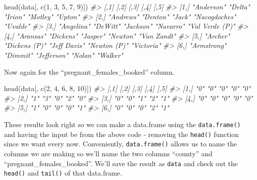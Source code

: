 \documentclass[
]{krantz}
\makeatletter
\newenvironment{Shaded}{\begin{snugshade}}{\end{snugshade}}
\newcommand{\CommentTok}[1]{\textcolor[rgb]{0.37,0.37,0.37}{\textit{#1}}}
\newcommand{\DecValTok}[1]{\textcolor[rgb]{0.06,0.06,0.06}{#1}}
\newcommand{\FunctionTok}[1]{\textcolor[rgb]{0,0,0}{#1}}
\newcommand{\NormalTok}[1]{#1}
\newenvironment{kframe}{%
\medskip{}
\setlength{\fboxsep}{.8em}
 \def\at@end@of@kframe{}%
 \ifinner\ifhmode%
  \def\at@end@of@kframe{\end{minipage}}%
  \begin{minipage}{\columnwidth}%
 \fi\fi%
 \def\FrameCommand##1{\hskip\@totalleftmargin \hskip-\fboxsep
 \colorbox{shadecolor}{##1}\hskip-\fboxsep
     \hskip-\linewidth \hskip-\@totalleftmargin \hskip\columnwidth}%
 \MakeFramed {\advance\hsize-\width
   \@totalleftmargin\z@ \linewidth\hsize
   \@setminipage}}%
 {\par\unskip\endMakeFramed%
 \at@end@of@kframe}
\renewenvironment{Shaded}{\begin{kframe}}{\end{kframe}}
\makeatother
\begin{document}
\begin{Shaded}
\begin{Highlighting}[]
\FunctionTok{head}\NormalTok{(data[, }\FunctionTok{c}\NormalTok{(}\DecValTok{1}\NormalTok{, }\DecValTok{3}\NormalTok{, }\DecValTok{5}\NormalTok{, }\DecValTok{7}\NormalTok{, }\DecValTok{9}\NormalTok{)])}
\CommentTok{\#\textgreater{}      [,1]        [,2]          [,3]         [,4]          [,5]           }
\CommentTok{\#\textgreater{} [1,] "Anderson"  "Delta"       "Irion"      "Motley"      "Upton"        }
\CommentTok{\#\textgreater{} [2,] "Andrews"   "Denton"      "Jack"       "Nacogdoches" "Uvalde"       }
\CommentTok{\#\textgreater{} [3,] "Angelina"  "DeWitt"      "Jackson"    "Navarro"     "Val Verde (P)"}
\CommentTok{\#\textgreater{} [4,] "Aransas"   "Dickens"     "Jasper"     "Newton"      "Van Zandt"    }
\CommentTok{\#\textgreater{} [5,] "Archer"    "Dickens (P)" "Jeff Davis" "Newton (P)"  "Victoria"     }
\CommentTok{\#\textgreater{} [6,] "Armstrong" "Dimmit"      "Jefferson"  "Nolan"       "Walker"}
\end{Highlighting}
\end{Shaded}

Now again for the ``pregnant\_females\_booked'' column.

\begin{Shaded}
\begin{Highlighting}[]
\FunctionTok{head}\NormalTok{(data[, }\FunctionTok{c}\NormalTok{(}\DecValTok{2}\NormalTok{, }\DecValTok{4}\NormalTok{, }\DecValTok{6}\NormalTok{, }\DecValTok{8}\NormalTok{, }\DecValTok{10}\NormalTok{)])}
\CommentTok{\#\textgreater{}      [,1] [,2] [,3] [,4] [,5]}
\CommentTok{\#\textgreater{} [1,] "0"  "0"  "0"  "0"  "0" }
\CommentTok{\#\textgreater{} [2,] "1"  "3"  "0"  "2"  "0" }
\CommentTok{\#\textgreater{} [3,] "0"  "0"  "1"  "2"  "1" }
\CommentTok{\#\textgreater{} [4,] "0"  "0"  "0"  "0"  "0" }
\CommentTok{\#\textgreater{} [5,] "1"  "0"  "0"  "0"  "1" }
\CommentTok{\#\textgreater{} [6,] "0"  "0"  "0"  "2"  "1"}
\end{Highlighting}
\end{Shaded}

These results look right so we can make a data.frame using the \texttt{data.frame()} and having the input be from the above code - removing the \texttt{head()} function since we want every now. Conveniently, \texttt{data.frame()} allows us to name the columns we are making so we'll name the two columns ``county'' and ``pregnant\_females\_booked''. We'll save the result as \texttt{data} and check out the \texttt{head()} and \texttt{tail()} of that data.frame.
\end{document}

